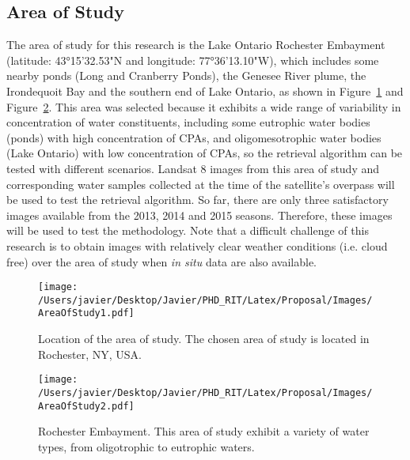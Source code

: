 \subsection{Area of Study}
\label{subsec:areaofstudy}
The area of study for this research is the Lake Ontario Rochester Embayment (latitude: 43°15'32.53"N and longitude: 77°36'13.10"W), which includes some nearby ponds (Long and Cranberry Ponds), the Genesee River plume, the Irondequoit Bay and the southern end of Lake Ontario, as shown in Figure~\ref{fig:areaofstudy1} and Figure~\ref{fig:areaofstudy2}. This area was selected because it exhibits a wide range of variability in concentration of water constituents, including some eutrophic water bodies (ponds) with high concentration of CPAs, and oligomesotrophic water bodies (Lake Ontario) with low concentration of CPAs, so the retrieval algorithm can be tested with different scenarios. Landsat 8 images from this area of study and corresponding water samples collected at the time of the satellite's overpass will be used to test the retrieval algorithm. So far, there are only three satisfactory images available from the 2013, 2014 and 2015 seasons. Therefore, these images will be used to test the methodology. Note that a difficult challenge of this research is to obtain images with relatively clear weather conditions (i.e. cloud free) over the area of study when {\it in situ} data are also available.
\begin{figure}[htb]
  \centering
  \texttt{[image: /Users/javier/Desktop/Javier/PHD\_RIT/Latex/Proposal/Images/AreaOfStudy1.pdf]}
  \caption{Location of the area of study. The chosen area of study is located in Rochester, NY, USA. \label{fig:areaofstudy1} } 
\end{figure}
\begin{figure}[htb]
  \centering
  \texttt{[image: /Users/javier/Desktop/Javier/PHD\_RIT/Latex/Proposal/Images/AreaOfStudy2.pdf]}
  \caption{Rochester Embayment. This area of study exhibit a variety of water types, from oligotrophic to eutrophic waters. \label{fig:areaofstudy2} } 
\end{figure}

